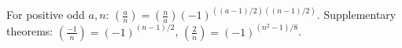 For positive odd $a,n$: $\left(\frac{a}{n}\right) = \left(\frac{n}{a}\right)(-1)^{((a-1)/2)((n-1)/2)}$.
Supplementary theorems: $\left(\frac{-1}{n}\right) = (-1)^{(n-1)/2}$, $\left(\frac{2}{n}\right) = (-1)^{(n^2-1)/8}$.
